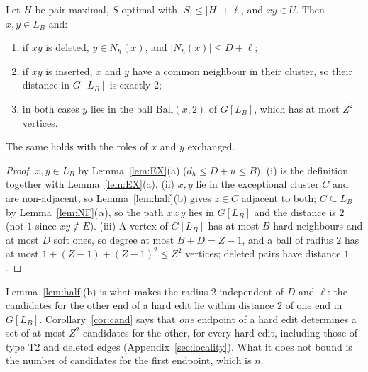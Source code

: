\begin{corollary}\label{cor:cand}
Let $H$ be pair-maximal, $S$ optimal with $|S|\le|H|+\ell$, and $xy\in U$. Then $x,y\in L_B$ and:
\begin{enumerate}
\item[(i)] if $xy$ is deleted, $y\in N_h(x)$, and $|N_h(x)|\le D+\ell$;
\item[(ii)] if $xy$ is inserted, $x$ and $y$ have a common neighbour in their cluster, so their distance in $G[L_B]$ is exactly $2$;
\item[(iii)] in both cases $y$ lies in the ball $\mathrm{Ball}(x,2)$ of $G[L_B]$, which has at most $Z^{2}$ vertices.
\end{enumerate}
The same holds with the roles of $x$ and $y$ exchanged.
\end{corollary}
\begin{proof}
$x,y\in L_B$ by Lemma~\ref{lem:EX}(a) ($d_h\le D+u\le B$). (i) is the definition together with Lemma~\ref{lem:EX}(a). (ii) $x,y$ lie in the exceptional cluster $C$ and are non-adjacent, so Lemma~\ref{lem:half}(b) gives $z\in C$ adjacent to both; $C\subseteq L_B$ by Lemma~\ref{lem:NF}($\alpha$), so the path $x\,z\,y$ lies in $G[L_B]$ and the distance is $2$ (not $1$ since $xy\notin E$). (iii) A vertex of $G[L_B]$ has at most $B$ hard neighbours and at most $D$ soft ones, so degree at most $B+D=Z-1$, and a ball of radius $2$ has at most $1+(Z-1)+(Z-1)^2\le Z^2$ vertices; deleted pairs have distance $1$.
\end{proof}
Lemma~\ref{lem:half}(b) is what makes the radius $2$ independent of $D$ and $\ell$: the candidates for the other end of a hard edit lie within distance $2$ of one end in $G[L_B]$. Corollary~\ref{cor:cand} says that \emph{one} endpoint of a hard edit determines a set of at most $Z^2$ candidates for the other, for every hard edit, including those of type T2 and deleted edges (Appendix~\ref{sec:locality}). What it does not bound is the number of candidates for the first endpoint, which is $n$.
